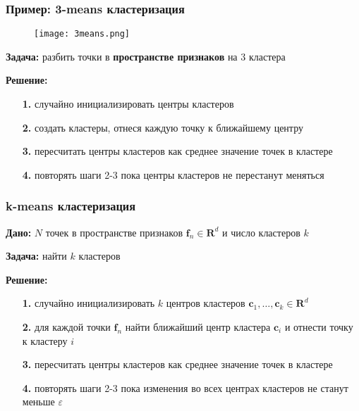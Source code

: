 \documentclass[12pt, usepdftitle=false, aspectratio=1610]{beamer}
\begin{document}
\begin{frame}
\frametitle{Пример: 3-means кластеризация}
\begin{wrapfigure}{r}{0.3\textwidth}
    \vspace{-40pt}
    \begin{center}
        \texttt{[image: 3means.png]}
    \end{center}
\end{wrapfigure}

\textbf{Задача:} разбить точки в \textbf{пространстве признаков} на $3$ кластера
\vspace*{1cm}

\textbf{Решение:}
\vspace*{0.5cm}
\begin{itemize}
    \item[\textbf{1.}] случайно инициализировать центры кластеров 
    \vspace*{0.2cm}
    \item[\textbf{2.}] создать кластеры, отнеся каждую точку к ближайшему центру
    \vspace*{0.2cm}
    \item[\textbf{3.}] пересчитать центры кластеров как среднее значение точек в кластере
    \vspace*{0.2cm}
    \item[\textbf{4.}] повторять шаги 2-3 пока центры кластеров не перестанут меняться
\end{itemize}
\end{frame}

\begin{frame}
\frametitle{k-means кластеризация}

\textbf{Дано:} $N$ точек в пространстве признаков $\boldsymbol{f}_n\in\mathbf{R}^d$ и число кластеров $k$
\vspace*{0.5cm}

\textbf{Задача:} найти $k$ кластеров
\vspace*{0.5cm}

\textbf{Решение:}
\vspace*{0.2cm}
\begin{itemize}
    \item[\textbf{1.}] случайно инициализировать $k$ центров кластеров $\boldsymbol{c}_1,\ldots,\boldsymbol{c}_k\in\mathbf{R}^d$
    \vspace*{0.2cm}
    \item[\textbf{2.}] для каждой точки $\boldsymbol{f}_n$ найти ближайший центр кластера $\boldsymbol{c}_i$ и отнести точку к  кластеру $i$
    \vspace*{0.2cm}
    \item[\textbf{3.}] пересчитать центры кластеров как среднее значение точек в кластере
    \vspace*{0.2cm}
    \item[\textbf{4.}] повторять шаги 2-3 пока изменения во всех центрах кластеров не станут меньше $\varepsilon$
\end{itemize}
\end{frame}
\end{document}
